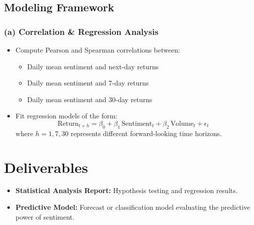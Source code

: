 \documentclass[12pt]{article}
\begin{document}
\subsection{Modeling Framework}

\subsubsection{(a) Correlation \& Regression Analysis}

\begin{itemize}
    \item Compute Pearson and Spearman correlations between:
    \begin{itemize}
        \item Daily mean sentiment and next-day returns
        \item Daily mean sentiment and 7-day returns
        \item Daily mean sentiment and 30-day returns
    \end{itemize}

    \item Fit regression models of the form:
   \[
    \mathrm{Return}_{t+h} = \beta_0 + \beta_1\,\mathrm{Sentiment}_t + \beta_2\,\mathrm{Volume}_t + \epsilon_t
\]
where \( h = 1, 7, 30 \) represents different forward-looking time horizons.
\end{itemize}

\section{Deliverables}

\begin{itemize}
    \item \textbf{Statistical Analysis Report:} Hypothesis testing and regression results.
    \item \textbf{Predictive Model:} Forecast or classification model evaluating the predictive power of sentiment.
\end{itemize}
\end{document}
